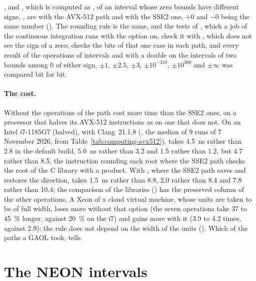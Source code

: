 \begin{Rem}\label{rem:avx512-zero}
,  and , which is computed as
,\newinvfive{} of an interval whose zero bounds have different
signs, , are  with the AVX-512 path and 
with the SSE2 one, $+0$ and $-0$ being the same number
(). The rounding rule is the same, and the tests of
, which a job of the continuous integration runs with the option
on, check it with \code{==}, which does not see the sign of a zero;
 checks the bits of that one case in each path, and
every result of the operations of intervals and with a double on the
intervals of two bounds among 0 of either sign, $\pm1$, $\pm2.5$, $\pm3$,
$\pm10^{-310}$, $\pm10^{300}$ and $\pm\infty$ was compared bit for bit.
\end{Rem}

\medskip
\paragraph{The cost.} Without  the
operations of the path cost more time than the SSE2 ones, on a processor that
halves its AVX-512 instructions as on one that does not. On an Intel i7-1185G7 (halved), with Clang~21.1.8
(, the median of 9 runs of 7 November 2026, from
Table~\ref{tab:computing-avx512}),  takes
4.5~ns rather than 2.8 in the default build,  5.0~ns rather than
3.2 and  1.5 rather than 1.2, but  4.7 rather than
8.5, the instruction rounding each root where the SSE2 path checks the root
of the C library with a product. With , where
the SSE2 path saves and restores the direction,  takes 1.5~ns
rather than 8.8,  2.0 rather than 8.4 and  7.8
rather than 10.4; the comparison of the libraries () has
the preserved column of the other operations. A Xeon of a cloud virtual
machine, whose units are taken to be of full width, loses more without that
option (the seven operations take 37 to 45~\% longer, against 20~\% on the
i7) and gains more with it (3.9 to 4.2 times, against 2.9): the rule does not
depend on the width of the units (). Which of the paths a GAOL took,
 tells.

\section{The NEON intervals}\label{sec:neon}
%


